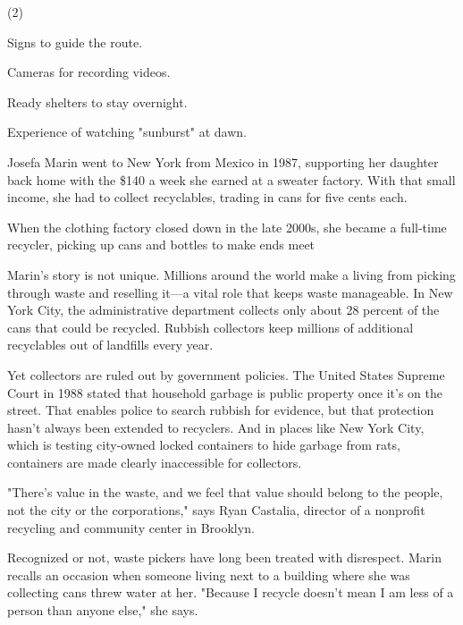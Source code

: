 \documentclass{英语试卷}
\begin{document}
\begin{choices}(2)
  \item Signs to guide the route.
  \item Cameras for recording videos.
  \item Ready shelters to stay overnight.
  \item Experience of watching "sunburst" at dawn.
\end{choices}
\par Josefa Marin went to New York from Mexico in 1987, supporting her daughter back home with the \$140 a week she earned at a sweater factory. With that small income, she had to collect recyclables, trading in cans for five cents each.\par
\par When the clothing factory closed down in the late 2000s, she became a full-time recycler, picking up cans and bottles to make ends meet\par
\par Marin's story is not unique. Millions around the world make a living from picking through waste and reselling it—a vital role that keeps waste manageable. In New York City, the administrative department collects only about 28 percent of the cans that could be recycled. Rubbish collectors keep millions of additional recyclables out of landfills every year.\par
\par Yet collectors are ruled out by government policies. The United States Supreme Court in 1988 stated that household garbage is public property once it's on the street. That enables police to search rubbish for evidence, but that protection hasn't always been extended to recyclers. And in places like New York City, which is testing city-owned locked containers to hide garbage from rats, containers are made clearly inaccessible for collectors.\par
\par "There's value in the waste, and we feel that value should belong to the people, not the city or the corporations," says Ryan Castalia, director of a nonprofit recycling and community center in Brooklyn.\par
\par Recognized or not, waste pickers have long been treated with disrespect. Marin recalls an occasion when someone living next to a building where she was collecting cans threw water at her. "Because I recycle doesn't mean I am less of a person than anyone else," she says.\par
\end{document}
